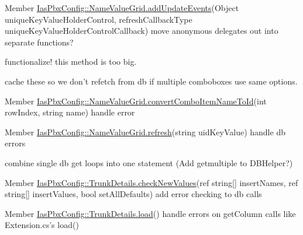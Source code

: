 \label{todo__todo000040}
\hypertarget{todo__todo000040}{}
 
\begin{DoxyDescription}
\item[Member \hyperlink{class_ias_pbx_config_1_1_name_value_grid_a5f999a6912fe2342c2edef12bd6d1e2f}{IasPbxConfig::NameValueGrid.addUpdateEvents}(Object uniqueKeyValueHolderControl, refreshCallbackType uniqueKeyValueHolderControlCallback) ]move anonymous delegates out into separate functions? 

functionalize! this method is too big. 

cache these so we don't refetch from db if multiple comboboxes use same options. 
\end{DoxyDescription}

\label{todo__todo000043}
\hypertarget{todo__todo000043}{}
 
\begin{DoxyDescription}
\item[Member \hyperlink{class_ias_pbx_config_1_1_name_value_grid_afa2c2d0522757b0450a5cbbe6a19d526}{IasPbxConfig::NameValueGrid.convertComboItemNameToId}(int rowIndex, string name) ]handle error 
\end{DoxyDescription}

\label{todo__todo000042}
\hypertarget{todo__todo000042}{}
 
\begin{DoxyDescription}
\item[Member \hyperlink{class_ias_pbx_config_1_1_name_value_grid_a99e4cae8063bc38014c310a90e59b779}{IasPbxConfig::NameValueGrid.refresh}(string uidKeyValue) ]handle db errors 

combine single db get loops into one statement (Add getmultiple to DBHelper?) 
\end{DoxyDescription}

\label{todo__todo000048}
\hypertarget{todo__todo000048}{}
 
\begin{DoxyDescription}
\item[Member \hyperlink{class_ias_pbx_config_1_1_trunk_details_acdc7d06a5f58918faabd4057300585d3}{IasPbxConfig::TrunkDetails.checkNewValues}(ref string\mbox{[}\mbox{]} insertNames, ref string\mbox{[}\mbox{]} insertValues, bool setAllDefaults) ]add error checking to db calls 
\end{DoxyDescription}

\label{todo__todo000044}
\hypertarget{todo__todo000044}{}
 
\begin{DoxyDescription}
\item[Member \hyperlink{class_ias_pbx_config_1_1_trunk_details_a2dd1283dc843a19b6d5cc13e957c322b}{IasPbxConfig::TrunkDetails.load}() ]handle errors on getColumn calls like Extension.cs's load() 
\end{DoxyDescription}

